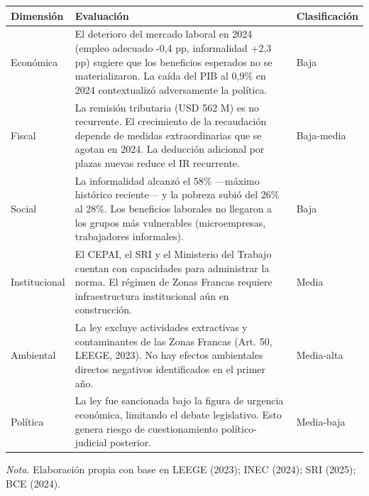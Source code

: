 \documentclass[12pt,spanish]{article}
\newcounter{none}
\begin{document}
{\def\LTcaptype{none} %
\begin{longtable}[]{@{}
  >{\raggedright\arraybackslash}p{}
  >{\raggedright\arraybackslash}p{}
  >{\centering\arraybackslash}p{}@{}}
\toprule\noalign{}
\begin{minipage}[b]{\linewidth}\raggedright
Dimensión
\end{minipage} & \begin{minipage}[b]{\linewidth}\raggedright
Evaluación
\end{minipage} & \begin{minipage}[b]{\linewidth}\centering
Clasificación
\end{minipage} \\
\midrule\noalign{}
\endhead
\bottomrule\noalign{}
\endlastfoot
Económica & El deterioro del mercado laboral en 2024 (empleo adecuado
-0,4 pp, informalidad +2,3 pp) sugiere que los beneficios esperados no
se materializaron. La caída del PIB al 0,9\% en 2024 contextualizó
adversamente la política. & Baja \\
Fiscal & La remisión tributaria (USD 562 M) es no recurrente. El
crecimiento de la recaudación depende de medidas extraordinarias que se
agotan en 2024. La deducción adicional por plazas nuevas reduce el IR
recurrente. & Baja-media \\
Social & La informalidad alcanzó el 58\% ---máximo histórico reciente---
y la pobreza subió del 26\% al 28\%. Los beneficios laborales no
llegaron a los grupos más vulnerables (microempresas, trabajadores
informales). & Baja \\
Institucional & El CEPAI, el SRI y el Ministerio del Trabajo cuentan con
capacidades para administrar la norma. El régimen de Zonas Francas
requiere infraestructura institucional aún en construcción. & Media \\
Ambiental & La ley excluye actividades extractivas y contaminantes de
las Zonas Francas (Art. 50, LEEGE, 2023). No hay efectos ambientales
directos negativos identificados en el primer año. & Media-alta \\
Política & La ley fue sancionada bajo la figura de urgencia económica,
limitando el debate legislativo. Esto genera riesgo de cuestionamiento
político-judicial posterior. & Media-baja \\
\end{longtable}
}

\emph{Nota.} Elaboración propia con base en LEEGE (2023); INEC (2024);
SRI (2025); BCE (2024).
\end{document}
